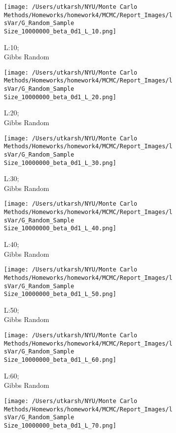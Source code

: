 \documentclass[11pt]{article}
\begin{document}
\begin{figure}[H]
	\centering
	\begin{subfigure}{.20\textwidth}
		\texttt{[image: /Users/utkarsh/NYU/Monte Carlo Methods/Homeworks/homework4/MCMC/Report\_Images/lsVar/G\_Random\_Sample Size\_10000000\_beta\_0d1\_L\_10.png]}
		\caption{L:10;\\Gibbs Random}
	\end{subfigure}
	\begin{subfigure}{.20\textwidth}
		\texttt{[image: /Users/utkarsh/NYU/Monte Carlo Methods/Homeworks/homework4/MCMC/Report\_Images/lsVar/G\_Random\_Sample Size\_10000000\_beta\_0d1\_L\_20.png]}
		\caption{L:20;\\Gibbs Random}
	\end{subfigure}
	\begin{subfigure}{.20\textwidth}
		\texttt{[image: /Users/utkarsh/NYU/Monte Carlo Methods/Homeworks/homework4/MCMC/Report\_Images/lsVar/G\_Random\_Sample Size\_10000000\_beta\_0d1\_L\_30.png]}
		\caption{L:30;\\Gibbs Random}
	\end{subfigure}
	\begin{subfigure}{.20\textwidth}
		\texttt{[image: /Users/utkarsh/NYU/Monte Carlo Methods/Homeworks/homework4/MCMC/Report\_Images/lsVar/G\_Random\_Sample Size\_10000000\_beta\_0d1\_L\_40.png]}
		\caption{L:40;\\Gibbs Random}
	\end{subfigure}
	\begin{subfigure}{.20\textwidth}
		\texttt{[image: /Users/utkarsh/NYU/Monte Carlo Methods/Homeworks/homework4/MCMC/Report\_Images/lsVar/G\_Random\_Sample Size\_10000000\_beta\_0d1\_L\_50.png]}
		\caption{L:50;\\Gibbs Random}
	\end{subfigure}
	\begin{subfigure}{.20\textwidth}
		\texttt{[image: /Users/utkarsh/NYU/Monte Carlo Methods/Homeworks/homework4/MCMC/Report\_Images/lsVar/G\_Random\_Sample Size\_10000000\_beta\_0d1\_L\_60.png]}
		\caption{L:60;\\Gibbs Random}
	\end{subfigure}
	\begin{subfigure}{.20\textwidth}
		\texttt{[image: /Users/utkarsh/NYU/Monte Carlo Methods/Homeworks/homework4/MCMC/Report\_Images/lsVar/G\_Random\_Sample Size\_10000000\_beta\_0d1\_L\_70.png]}

\end{subfigure}
\end{figure}
\end{document}
